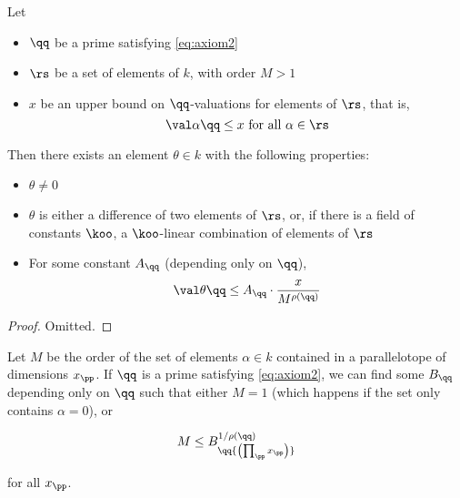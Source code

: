 \begin{lemma}
  \label{thm:thetaexists}
  Let
  \begin{itemize}
  \item $\qq$ be a prime satisfying \ref{eq:axiom2}
  \item $\rs$ be a set of elements of $k$, with order $M>1$
  \item $x$ be an upper bound on $\qq$-valuations for elements of $\rs$, that is,
    \[ \val\alpha\qq \leq x \text{ for all } \alpha\in\rs \]
  \end{itemize}
  Then there exists an element $\theta\in k$ with the following properties:
  \begin{itemize}
  \item $\theta\neq 0$
  \item $\theta$ is either a difference of two elements of $\rs$, or, if there
    is a field of constants $\koo$, a $\koo$-linear combination of elements of $\rs$
  \item For some constant $A_\qq$ (depending only on $\qq$),
    \[ \val\theta\qq \leq A_\qq \cdot \frac x{M^{\rho(\qq)}} \]
  \end{itemize}
\end{lemma}

\begin{proof}
  Omitted.


\end{proof}

\begin{lemma}
  Let $M$ be the order of the set of elements $\alpha\in k$ contained in a
  parallelotope of dimensions $x_\pp$. If $\qq$ is a prime satisfying
  \ref{eq:axiom2}, we can find some $B_\qq$ depending only on $\qq$ such that
  either $M = 1$ (which happens if the set only contains $\alpha=0$), or

  \[ M \leq B_\qq  {\left( \prod_\pp x_\pp \right)} ^{1/\rho(\qq)} \]

  for all $x_\pp$.
\end{lemma}

